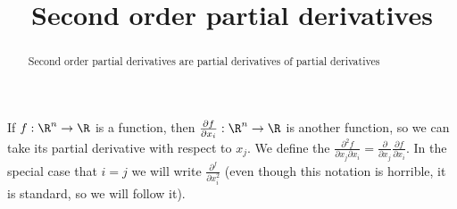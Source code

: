 \documentclass{ximera}
\title{Second order partial derivatives}
\begin{document}
	\begin{abstract}
		Second order partial derivatives are partial derivatives of partial derivatives
	\end{abstract}
	
	\begin{definition}
		If $f:\R^n \to \R$ is a function, then $\frac{\partial f}{\partial x_i}:\R^n \to \R$ is another function, so we can take its partial derivative with respect to $x_j$.
		We define the  $\frac{\partial^2f}{\partial x_j \partial x_i} = \frac{\partial}{\partial x_j} \frac{\partial f}{\partial x_i}$.  In the special case
		that $i=j$ we will write $\frac{\partial^f}{\partial x_i^2}$ (even though this notation is horrible, it is standard, so we will follow it).
	\end{definition}
	
\end{document}
